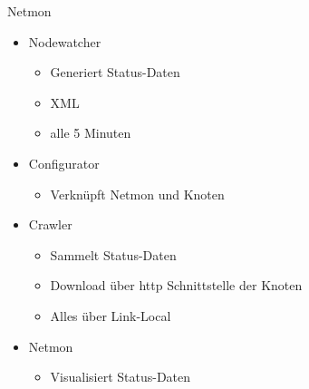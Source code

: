 \begin{frame}{Netmon}
    \begin{itemize}
        \item Nodewatcher
        \begin{itemize}
            \item Generiert Status-Daten
            \item XML
            \item alle 5 Minuten
        \end{itemize}
        \item Configurator
        \begin{itemize}
            \item Verknüpft Netmon und Knoten
        \end{itemize}
        \item Crawler
        \begin{itemize}
            \item Sammelt Status-Daten
            \item Download über http Schnittstelle der Knoten
            \item Alles über Link-Local
        \end{itemize}
        \item Netmon
        \begin{itemize}
            \item Visualisiert Status-Daten
        \end{itemize}
    \end{itemize}
\end{frame}
